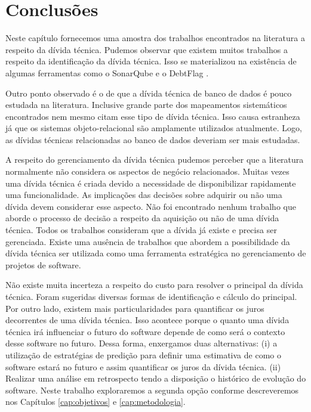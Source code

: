 








\section{Conclusões}

Neste capítulo fornecemos uma amostra dos trabalhos encontrados na literatura a respeito da dívida técnica. Pudemos observar que existem muitos trabalhos a respeito da identificação da dívida técnica. Isso se materializou na existência de algumas ferramentas como o SonarQube e o DebtFlag \cite{holvitie2013debtflag}. 

Outro ponto observado é o de que a dívida técnica de banco de dados  é pouco estudada na literatura. Inclusive grande parte dos mapeamentos sistemáticos encontrados nem mesmo citam esse tipo de dívida técnica. Isso causa estranheza já que os sistemas objeto-relacional são amplamente utilizados atualmente. Logo,  as dívidas técnicas relacionadas ao banco de dados deveriam ser mais estudadas.

A respeito do gerenciamento da dívida técnica pudemos perceber que a literatura normalmente não considera os aspectos de negócio relacionados. Muitas vezes uma dívida técnica é criada devido a necessidade de disponibilizar rapidamente uma funcionalidade. As implicações das decisões sobre adquirir ou não uma dívida devem considerar esse aspecto.  Não foi encontrado nenhum trabalho que aborde o processo de decisão a respeito da aquisição ou não de uma dívida técnica. Todos os trabalhos consideram que a dívida já existe e precisa ser gerenciada. Existe uma ausência de trabalhos que abordem a possibilidade da dívida técnica ser utilizada como uma ferramenta  estratégica no gerenciamento de projetos de software.

Não existe muita incerteza a respeito do custo para resolver o principal da dívida técnica. Foram sugeridas diversas formas de identificação e cálculo do principal. Por outro lado, existem mais particularidades para quantificar os juros decorrentes de uma dívida técnica. Isso acontece porque o quanto uma dívida técnica irá influenciar o futuro do software depende de como será o contexto desse software no futuro. Dessa forma, enxergamos duas alternativas: (i) a utilização de estratégias de predição para definir uma estimativa de como o software estará no futuro e assim quantificar os juros da dívida técnica. (ii) Realizar uma análise em retrospecto tendo a disposição o histórico de evolução do software. Neste trabalho exploraremos a segunda opção conforme descreveremos nos Capítulos \ref{cap:objetivos} e \ref{cap:metodologia}.


